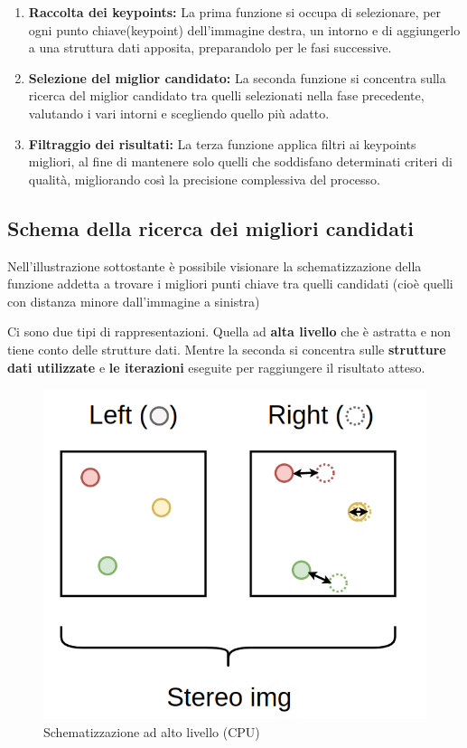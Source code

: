 \documentclass[12pt,a4paper]{report}
\begin{document}
\begin{enumerate}
    \item \textbf{Raccolta dei keypoints:} La prima funzione si occupa di selezionare, per ogni punto chiave(keypoint) dell'immagine destra, un intorno e di aggiungerlo a una struttura dati apposita, preparandolo per le fasi successive.
    \item \textbf{Selezione del miglior candidato:} La seconda funzione si concentra sulla ricerca del miglior candidato tra quelli selezionati nella fase precedente, valutando i vari intorni e scegliendo quello più adatto.
    \item \textbf{Filtraggio dei risultati:} La terza funzione applica filtri ai keypoints migliori, al fine di mantenere solo quelli che soddisfano determinati criteri di qualità, migliorando così la precisione complessiva del processo.
\end{enumerate}

\newpage
\subsection{Schema della ricerca dei migliori candidati}

Nell'illustrazione sottostante è possibile visionare la schematizzazione della funzione addetta a trovare i migliori punti chiave tra quelli candidati (cioè quelli con distanza minore dall'immagine a sinistra)

Ci sono due tipi di rappresentazioni. Quella ad \textbf{alta livello} che è astratta e non tiene conto delle strutture dati. Mentre la seconda si concentra sulle \textbf{strutture dati utilizzate} e \textbf{le iterazioni} eseguite per raggiungere il risultato atteso.

\begin{figure}[h]
    \centering
    \includegraphics[width=0.5\linewidth]{img/find_distance_high_scheme.png}
    \caption{Schematizzazione ad alto livello (CPU) }
\end{figure}
\end{document}
